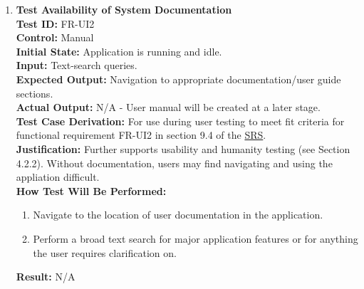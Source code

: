 \documentclass[12pt, titlepage]{article}
\begin{document}
\begin{enumerate}
    \item \textbf{Test Availability of System Documentation} \\
      \newline
      \textbf{Test ID:} FR-UI2 \\
      \textbf{Control:} Manual \\
      \textbf{Initial State:} Application is running and idle. \\
      \textbf{Input:} Text-search queries. \\
      \textbf{Expected Output:} Navigation to appropriate documentation/user guide sections. \\
      \textbf{Actual Output:} N/A - User manual will be created at a later stage. \\
      \textbf{Test Case Derivation:} For use during user testing to meet fit criteria for functional requirement FR-UI2 in section 
      9.4 of the \href{https://github.com/emilyperica/ScoreGen/blob/main/docs/SRS-Volere/SRS.pdf}{SRS}. \\
      \textbf{Justification:} Further supports usability and humanity testing (see Section 4.2.2). Without documentation, 
      users may find navigating and using the appliation difficult.\\
      \textbf{How Test Will Be Performed:}
      \begin{enumerate}
          \item Navigate to the location of user documentation in the application.
          \item Perform a broad text search for major application features or for anything the user requires clarification on.
      \end{enumerate}
      \textbf{Result:} N/A
    

\end{enumerate}
\end{document}
